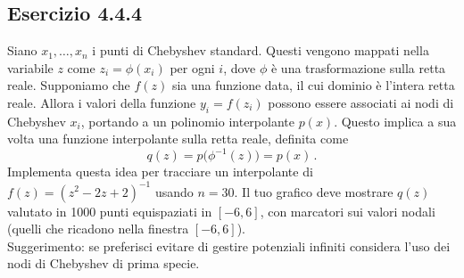 \documentclass[letterpaper, 12pt]{article}
\begin{document}
\subsection{Esercizio 4.4.4}
Siano $x_1,\ldots,x_n$ i punti di Chebyshev standard. Questi vengono mappati nella variabile $z$ come 
$z_i=\phi(x_i)$ per ogni $i$, dove $\phi$ è una trasformazione sulla retta reale. Supponiamo che $f(z)$ 
sia una funzione data, il cui dominio è l'intera retta reale. Allora i valori della funzione $y_i=f(z_i)$ 
possono essere associati ai nodi di Chebyshev $x_i$, portando a un polinomio interpolante $p(x)$. 
Questo implica a sua volta una funzione interpolante sulla retta reale, definita come
\begin{equation}
    q(z)=p\bigl(\phi^{-1}(z)\bigr) = p(x)\,.
\end{equation}
Implementa questa idea per tracciare un interpolante di $f(z)=(z^2-2z+2)^{-1}$ usando $n=30$. 
Il tuo grafico deve mostrare $q(z)$ valutato in 1000 punti equispaziati in $[-6,6]$, 
con marcatori sui valori nodali (quelli che ricadono nella finestra $[-6,6]$). \\
Suggerimento: se preferisci evitare di gestire potenziali infiniti considera l'uso dei nodi di Chebyshev di 
prima specie.
\end{document}
